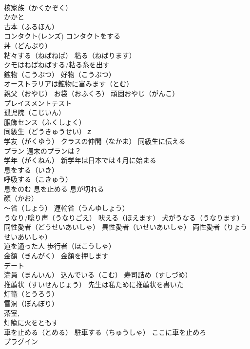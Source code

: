 \documentclass[8pt]{extreport}
\begin{document}
\begin{CJK}{UTF8}{min}
\\	核家族（かくかぞく）
\\	かかと
\\	古本（ふるほん）
\\	コンタクト(レンズ) コンタクトをする
\\	丼（どんぶり）
\\	粘々する（ねばねば） 粘る（ねばります） 
\\	クモはねばねばする/粘る糸を出す
\\	鉱物（こうぶつ） 好物（こうぶつ）
\\	オーストラリアは鉱物に富みます（とむ）
\\	親父（おやじ） お袋（おふくろ） 頑固おやじ（がんこ）
\\	プレイスメントテスト
\\	孤児院（こじいん）
\\	服飾センス（ふくしょく）
\\	同級生（どうきゅうせい）ｚ 
\\	学友（がくゆう） クラスの仲間（なかま） 同級生に伝える
\\	プラン 週末のプランは？
\\	学年（がくねん） 新学年は日本では４月に始まる
\\	息をする（いき） 
\\	呼吸する（こきゅう）
\\	息をのむ 息を止める 息が切れる
\\	顔（かお）
\\	～省（しょう） 運輸省（うんゆしょう）
\\	うなり/唸り声（うなりごえ） 吠える（ほえます） 犬がうなる（うなります）
\\	同性愛者（どうせいあいしゃ） 異性愛者（いせいあいしゃ） 両性愛者（りょうせいあいしゃ）
\\	道を通った人 歩行者（ほこうしゃ）
\\	金額（きんがく） 金額を押します
\\	デート
\\	満員（まんいん） 込んでいる（こむ） 寿司詰め（すしづめ）
\\	推薦状（すいせんじょう） 先生は私ために推薦状を書いた
\\	灯篭（とうろう）
\\	雪洞（ぼんぼり）
\\	茶室, 
\\	灯籠に火をともす
\\	車を止める（とめる） 駐車する（ちゅうしゃ） ここに車を止めろ
\\	プラグイン

\end{CJK}
\end{document}
